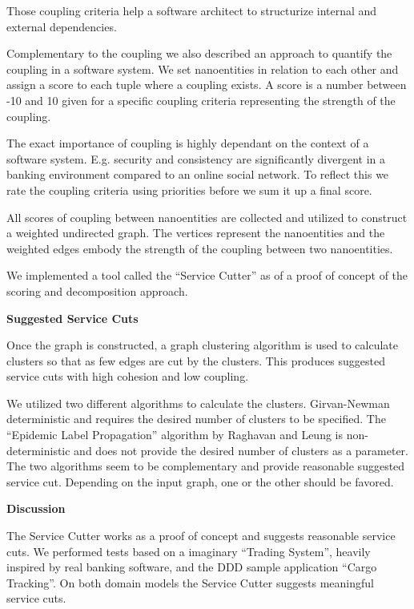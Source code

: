 Those coupling criteria help a software architect to structurize internal and external dependencies. 


Complementary to the coupling we also described an approach to quantify the coupling in a software system. We set nanoentities in relation to each other and assign a score to each tuple where a coupling exists. A score is a number between -10 and 10 given for a specific coupling criteria representing the strength of the coupling.

The exact importance of coupling is highly dependant on the context of a software system. E.g. security and consistency are significantly divergent in a banking environment compared to an online social network. To reflect this we rate the coupling criteria using priorities before we sum it up a final score.

All scores of coupling between nanoentities are collected and utilized to construct a weighted undirected graph. The vertices represent the nanoentities and the weighted edges embody the strength of the coupling between two nanoentities.

We implemented a tool called the \enquote{Service Cutter} as of a proof of concept of the scoring and decomposition approach.

\textbf{Suggested Service Cuts}

Once the graph is constructed, a graph clustering algorithm is used to calculate clusters so that as few edges are cut by the clusters. This produces suggested service cuts with high cohesion and low coupling.

We utilized two different algorithms to calculate the clusters. Girvan-Newman deterministic and requires the desired number of clusters to be specified. The \enquote{Epidemic Label Propagation} algorithm by Raghavan and Leung is non-deterministic and does not provide the desired number of clusters as a parameter. The two algorithms seem to be complementary and provide reasonable suggested service cut. Depending on the input graph, one or the other should be favored.

\textbf{Discussion}

The Service Cutter works as a proof of concept and suggests reasonable service cuts. We performed tests based on a imaginary \enquote{Trading System}, heavily inspired by real banking software, and the DDD sample application \enquote{Cargo Tracking}. On both domain models the Service Cutter suggests meaningful service cuts.

